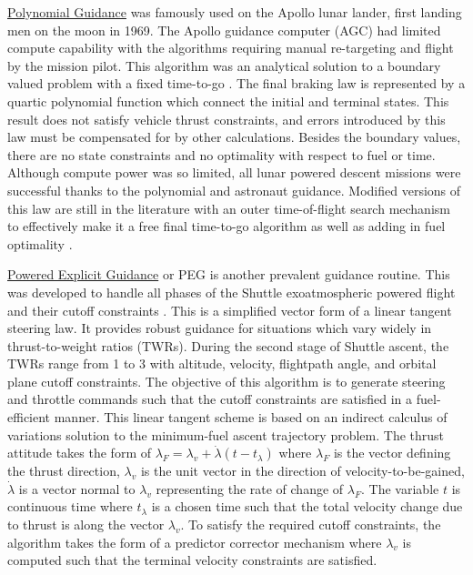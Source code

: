 \underline{Polynomial Guidance} was famously used on the Apollo lunar lander, first landing men on the moon in 1969. The Apollo guidance computer (AGC) had limited compute capability with the algorithms requiring manual re-targeting and flight by the mission pilot. This algorithm was an analytical solution to a boundary valued problem with a fixed time-to-go \cite{klumpp1974apollo}. The final braking law is represented by a quartic polynomial function which connect the initial and terminal states. This result does not satisfy vehicle thrust constraints, and errors introduced by this law must be compensated for by other calculations. Besides the boundary values, there are no state constraints and no optimality with respect to fuel or time. Although compute power was so limited, all lunar powered descent missions were successful thanks to the polynomial and astronaut guidance. Modified versions of this law are still in the literature with an outer time-of-flight search mechanism to effectively make it a free final time-to-go algorithm as well as adding in fuel optimality \cite{d1997optimal}.

\underline{Powered Explicit Guidance} or PEG is another prevalent guidance routine. This was developed to handle all phases of the Shuttle exoatmospheric powered flight and their cutoff constraints \cite{mchenry1979space}. This is a simplified vector form of a linear tangent steering law. It provides robust guidance for situations which vary widely in thrust-to-weight ratios (TWRs). During the second stage of Shuttle ascent, the TWRs range from 1 to 3 with altitude, velocity, flightpath angle, and orbital plane cutoff constraints. The objective of this algorithm is to generate steering and throttle commands such that the cutoff constraints are satisfied in a fuel-efficient manner. This linear tangent scheme is based on an indirect calculus of variations solution to the minimum-fuel ascent trajectory problem. The thrust attitude takes the form of $\lambda_F = \lambda_v + \dot{\lambda}(t - t_\lambda)$ where $\lambda_F$ is the vector defining the thrust direction, $\lambda_v$ is the unit vector in the direction of velocity-to-be-gained, $\dot{\lambda}$ is a vector normal to $\lambda_v$ representing the rate of change of $\lambda_F$. The variable $t$ is continuous time where $t_\lambda$ is a chosen time such that the total velocity change due to thrust is along the vector $\lambda_v$. To satisfy the required cutoff constraints, the algorithm takes the form of a predictor corrector mechanism where $\lambda_v$ is computed such that the terminal velocity constraints are satisfied.

